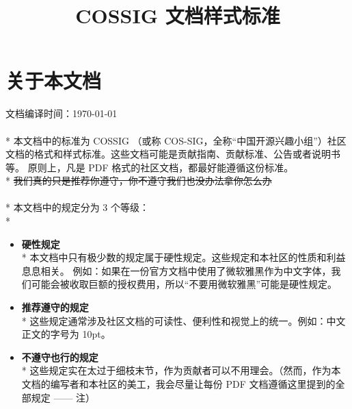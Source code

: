 

\setcounter{section}{-1}  %



    \title{\textbf{COSSIG 文档样式标准}}
    \author{}  %
    \date{}  %

    \maketitle

    \section{关于本文档}

    文档编译时间：\today
    \\
    \\*
    本文档中的标准为 COSSIG （或称 COS-SIG，全称“中国开源兴趣小组”）社区文档的格式和样式标准。这些文档可能是贡献指南、贡献标准、公告或者说明书等。
    原则上，凡是 PDF 格式的社区文档，都最好能遵循这份标准。\\*
    {\color{Grey0} \sout{我们真的只是推荐你遵守，你不遵守我们也没办法拿你怎么办}}
    \\
    \\*
    本文档中的规定分为 3 个等级：\\*
    \begin{itemize}
        \item \textbf{\large{硬性规定}}\\*
        本文档中只有极少数的规定属于硬性规定。这些规定和本社区的性质和利益息息相关。
        例如：如果在一份官方文档中使用了微软雅黑作为中文字体，我们可能会被收取巨额的授权费用，所以“不要用微软雅黑”可能是硬性规定。
        \\
        \item \textbf{\large{推荐遵守的规定}}\\*
        这些规定通常涉及社区文档的可读性、便利性和视觉上的统一。例如：中文正文的字号为 10pt。
        \\
        \item \textbf{\large{不遵守也行的规定}}\\*
        这些规定实在太过于细枝末节，作为贡献者可以不用理会。（然而，作为本文档的编写者和本社区的美工，我会尽量让每份 PDF 文档遵循这里提到的全部规定 —— 注）
        \\
    \end{itemize}

